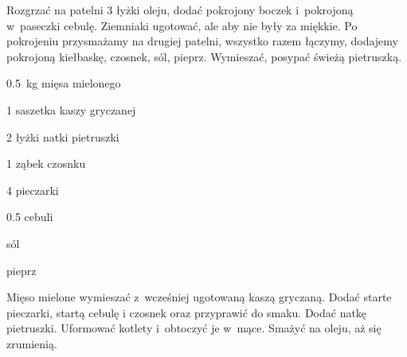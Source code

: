 \documentclass[../kucharek.tex]{subfiles}
\begin{document}
Rozgrzać na patelni \num{3} łyżki oleju, dodać pokrojony boczek i~pokrojoną
w~paseczki cebulę. Ziemniaki ugotować, ale aby nie były za miękkie. Po
pokrojeniu przysmażamy na drugiej patelni, wszystko razem łączymy, dodajemy
pokrojoną kiełbaskę, czosnek, sól, pieprz. Wymieszać, posypać świeżą
pietruszką.


\begin{Ingred}
    \item \qty{0.5}{\kilo\gram} mięsa mielonego
    \item \num{1} saszetka kaszy gryczanej
    \item \num{2} łyżki natki pietruszki
    \item \num{1} ząbek czosnku
    \item \num{4} pieczarki
    \item \num{0.5} cebuli
    \item sól
    \item pieprz
\end{Ingred}

Mięso mielone wymieszać z~wcześniej ugotowaną kaszą gryczaną. Dodać starte
pieczarki, startą cebulę i czosnek oraz przyprawić do smaku. Dodać natkę
pietruszki. Uformować kotlety i~obtoczyć je w~mące. Smażyć na oleju, aż się
zrumienią.
\end{document}

